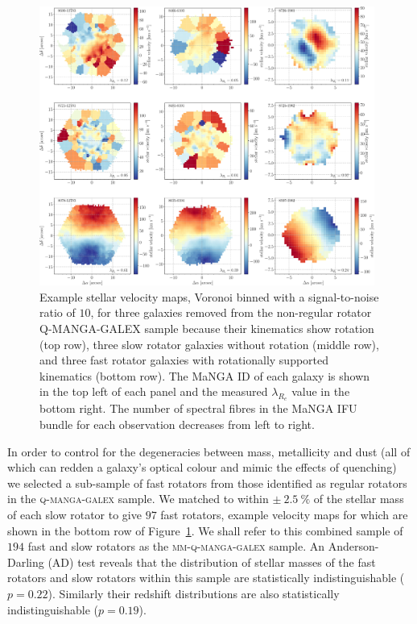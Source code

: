 \documentclass[useAMS,usenatbib]{mn2e}
\begin{document}
\begin{figure}
\centering
\includegraphics[width=0.98\textwidth]{../figures/proper_large_velmap_9_gal_aligned_ifu_bundles-MAPS-VOR10-GAU-MILESHC.pdf}
\caption{Example stellar velocity maps, Voronoi binned with a signal-to-noise ratio of $10$, for three galaxies removed from the non-regular rotator \textsc{Q-MANGA-GALEX} sample because their kinematics show rotation (top row), three slow rotator galaxies without rotation (middle row), and three fast rotator galaxies with rotationally supported kinematics (bottom row). The MaNGA ID of each galaxy is shown in the top left of each panel and the measured $\lambda_{R_{e}}$ value in the bottom right. The number of spectral fibres in the MaNGA IFU bundle for each observation decreases from left to right.}
\label{fig:exvelmaps}
\end{figure}  

In order to control for the degeneracies between mass, metallicity and dust (all of which can redden a galaxy's optical colour and mimic the effects of quenching) we selected a sub-sample of fast rotators from those identified as regular rotators in the \textsc{q-manga-galex} sample. We matched to within $\pm~2.5~\%$ of the stellar mass of each slow rotator to give $97$ fast rotators, example velocity maps for which are shown in the bottom row of Figure~\ref{fig:exvelmaps}. We shall refer to this combined sample of $194$ fast and slow rotators as the \textsc{mm-q-manga-galex} sample. An Anderson-Darling (AD) test reveals that the distribution of stellar masses of the fast rotators and slow rotators within this sample are statistically indistinguishable ($p=0.22$). Similarly their redshift distributions are also statistically indistinguishable ($p=0.19$).
\end{document}
